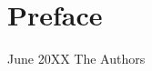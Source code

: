 %
%
\addglobaltitlecmark %
%
\chapter*{Preface}

\blindtext

\bigskip
\noindent June 20XX \hfill The Authors
\newpage
\nocite{*}

